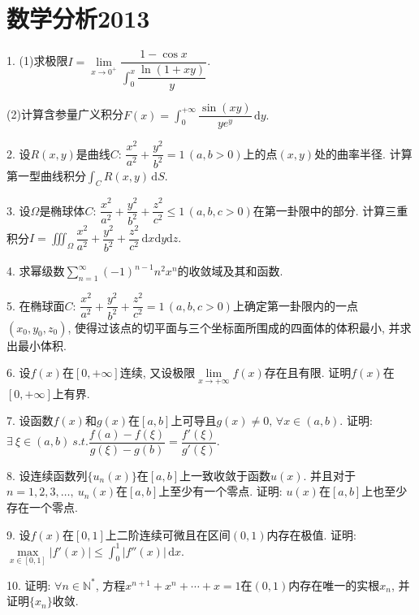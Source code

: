 \documentclass[12pt, a4paper, twoside]{ctexart}%
\newcommand{\rmd}{\mathrm{d}} %
\begin{document}
	\section{数学分析2013}
	1. (1)求极限$I=\lim\limits_{x\rightarrow0^+}\dfrac{1-\cos x}{\int_0^x\dfrac{\ln (1+xy)}{y}}$.\par 
	\hspace{1.2em}(2)计算含参量广义积分$F(x)=\int_0^{+\infty}\dfrac{\sin(xy)}{ye^y}\,\rmd y.$\par 
	2. 设$R(x,y)$是曲线$C:\,\dfrac{x^2}{a^2}+\dfrac{y^2}{b^2}=1\,(a,b>0)$上的点$(x,y)$处的曲率半径. 计算第一型曲线积分$\int_C R(x,y)\,\rmd S.$\par 
	3. 设$\Omega$是椭球体$C:\,\dfrac{x^2}{a^2}+\dfrac{y^2}{b^2}+\dfrac{z^2}{c^2}\leq1\,(a,b,c>0) $在第一卦限中的部分. 计算三重积分$I=\iiint_\Omega \dfrac{x^2}{a^2}+\dfrac{y^2}{b^2}+\dfrac{z^2}{c^2}\,\rmd x\rmd y\rmd z.$\par
	4. 求幂级数$\sum\limits_{n=1}^\infty(-1)^{n-1}n^2 x^n$的收敛域及其和函数.\par
	5. 在椭球面$C:\,\dfrac{x^2}{a^2}+\dfrac{y^2}{b^2}+\dfrac{z^2}{c^2}=1\,(a,b,c>0) $上确定第一卦限内的一点$(x_0,y_0,z_0)$, 使得过该点的切平面与三个坐标面所围成的四面体的体积最小, 并求出最小体积.\par
	6. 设$f(x)$在$[0,+\infty]$连续, 又设极限$\lim\limits_{x\rightarrow+\infty}f(x)$存在且有限. 证明$f(x)$在$[0,+\infty]$上有界.\par
	7. 设函数$f(x)\mbox{和}g(x)$在$[a,b]$上可导且$g(x)\neq0,\,\forall x\in(a,b)$. 证明: $\exists\ \xi\in(a,b)\ s.t. \dfrac{f(a)-f(\xi)}{g(\xi)-g(b)}=\dfrac{f'(\xi)}{g'(\xi)}.$\par 
	8. 设连续函数列$\{u_n(x)\}$在$[a,b]$上一致收敛于函数$u(x)$. 并且对于$n=1,2,3,\dots,\ u_n(x)\mbox{在}[a,b]$上至少有一个零点. 证明: $u(x)$在$[a,b]$上也至少存在一个零点.\par
	9. 设$f(x)$在$[0,1]$上二阶连续可微且在区间$(0,1)$内存在极值. 证明: $\max\limits_{x\in[0,1]}|f'(x)|\leq\int_0^1|f''(x)|\,\rmd x$.\par 
	10. 证明: $\forall n\in \mathbb{N}^*$, 方程$x^{n+1}+x^n+\cdots+x=1$在$(0,1)$内存在唯一的实根$x_n$, 并证明$\{x_n\}$收敛.\par
	\clearpage
\end{document}
